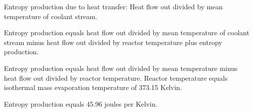 Entropy production due to heat transfer:  
Heat flow out divided by mean temperature of coolant stream.  

Entropy production equals heat flow out divided by mean temperature of coolant stream minus heat flow out divided by reactor temperature plus entropy production.  

Entropy production equals heat flow out divided by mean temperature minus heat flow out divided by reactor temperature.  
Reactor temperature equals isothermal mass evaporation temperature of 373.15 Kelvin.  

Entropy production equals 45.96 joules per Kelvin.